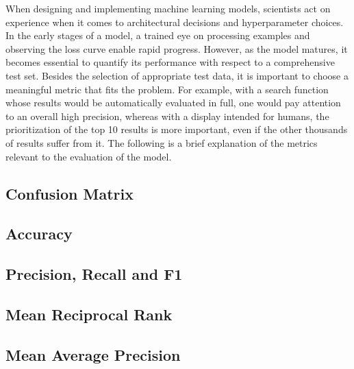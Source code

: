 When designing and implementing machine learning models, scientists act on experience when it comes to architectural decisions and hyperparameter choices. In the early stages of a model, a trained eye on processing examples and observing the loss curve enable rapid progress. However, as the model matures, it becomes essential to quantify its performance with respect to a comprehensive test set. Besides the selection of appropriate test data, it is important to choose a meaningful metric that fits the problem. For example, with a search function whose results would be automatically evaluated in full, one would pay attention to an overall high precision, whereas with a display intended for humans, the prioritization of the top 10 results is more important, even if the other thousands of results suffer from it. The following is a brief explanation of the metrics relevant to the evaluation of the model.

\subsection{Confusion Matrix}
\label{subsec:2_basics/4_metrics/1_confusion_matrix}


\subsection{Accuracy}
\label{subsec:2_basics/4_metrics/2_accuracy}


\subsection{Precision, Recall and F1}
\label{subsec:2_basics/4_metrics/3_prf}


\subsection{Mean Reciprocal Rank}
\label{subsec:2_basics/4_metrics/4_mrr}


\subsection{Mean Average Precision}
\label{subsec:2_basics/4_metrics/5_map}

